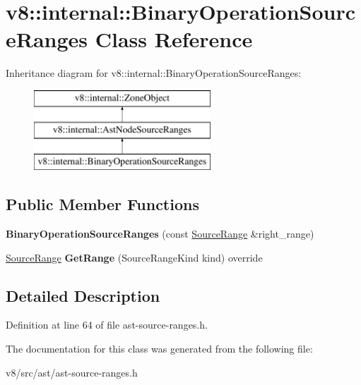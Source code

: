 \hypertarget{classv8_1_1internal_1_1BinaryOperationSourceRanges}{}\section{v8\+:\+:internal\+:\+:Binary\+Operation\+Source\+Ranges Class Reference}
\label{classv8_1_1internal_1_1BinaryOperationSourceRanges}
Inheritance diagram for v8\+:\+:internal\+:\+:Binary\+Operation\+Source\+Ranges\+:\begin{figure}[H]
\begin{center}
\leavevmode
\includegraphics[height=3.000000cm]{classv8_1_1internal_1_1BinaryOperationSourceRanges}
\end{center}
\end{figure}
\subsection*{Public Member Functions}
\begin{DoxyCompactItemize}
\item 
\mbox{\label{classv8_1_1internal_1_1BinaryOperationSourceRanges_a775b827bc91823a21e7c3a0ad1997407}} 
{\bfseries Binary\+Operation\+Source\+Ranges} (const \mbox{\hyperlink{structv8_1_1internal_1_1SourceRange}{Source\+Range}} \&right\+\_\+range)
\item 
\mbox{\label{classv8_1_1internal_1_1BinaryOperationSourceRanges_a08139dcab33a71faa35fc27888980246}} 
\mbox{\hyperlink{structv8_1_1internal_1_1SourceRange}{Source\+Range}} {\bfseries Get\+Range} (Source\+Range\+Kind kind) override
\end{DoxyCompactItemize}


\subsection{Detailed Description}


Definition at line 64 of file ast-\/source-\/ranges.\+h.



The documentation for this class was generated from the following file\+:\begin{DoxyCompactItemize}
\item 
v8/src/ast/ast-\/source-\/ranges.\+h\end{DoxyCompactItemize}
